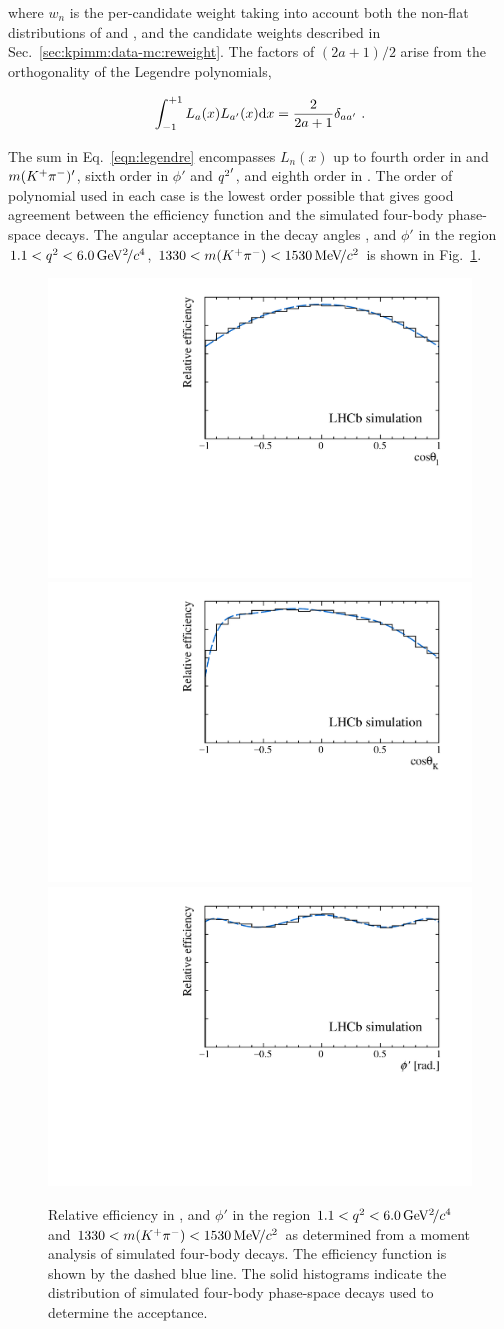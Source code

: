 \noindent where $w_{n}$ is the per-candidate weight taking into account both the non-flat distributions of \qsq and \mkpi, and the candidate weights described in Sec.~\ref{sec:kpimm:data-mc:reweight}. The factors of $(2a + 1)/2$ arise from the orthogonality of the Legendre polynomials,
 
\begin{equation}
\int_{-1}^{+1} L_{a}(x) L_{a'}(x) \mathrm{d} x = \frac{2}{2 a + 1}\delta_{ a a'}  ~.
\end{equation}

 The sum in Eq.~\ref{eqn:legendre} encompasses $L_n(x)$ up to fourth order in \ctl and $m({{K}^+}{{\pi}^-})'$, sixth order in $\phi'$ and ${q^2}'$, and eighth order in \ctk. The order of polynomial used in each case is the lowest order possible that gives good agreement between the efficiency function and the simulated four-body \BdToKpimm phase-space decays. The angular acceptance in the decay angles \ctl, \ctk and $\phi'$ in the region $1.1<{q^2}<6.0{\mathrm{\,Ge\kern -0.1em V^2\!/}c^4}$, $1330<m({{K}^+}{{\pi}^-})<1530{\mathrm{\,Me\kern -0.1em V\!/}c^2}$ is shown in Fig.~\ref{fig:acceptance}.

\begin{figure}[!htb]
  \centering
  \includegraphics[width=0.49\linewidth]{figs/kpimm/acceptance/ctl.pdf}
  \includegraphics[width=0.49\linewidth]{figs/kpimm/acceptance/ctk.pdf}\\
  \includegraphics[width=0.5\linewidth]{figs/kpimm/acceptance/phi.pdf}
  \caption{Relative efficiency in \ctl, \ctk and $\phi'$ in the region $1.1<{q^2}<6.0{\mathrm{\,Ge\kern -0.1em V^2\!/}c^4}$ and $1330<m({{K}^+}{{\pi}^-})<1530{\mathrm{\,Me\kern -0.1em V\!/}c^2}$ as determined from a moment analysis of simulated four-body \BdToKpimm decays. The efficiency function is shown by the dashed blue line.  The solid histograms indicate the distribution of simulated four-body \BdToKpimm phase-space decays used to determine the acceptance.}
\label{fig:acceptance}
\end{figure}
